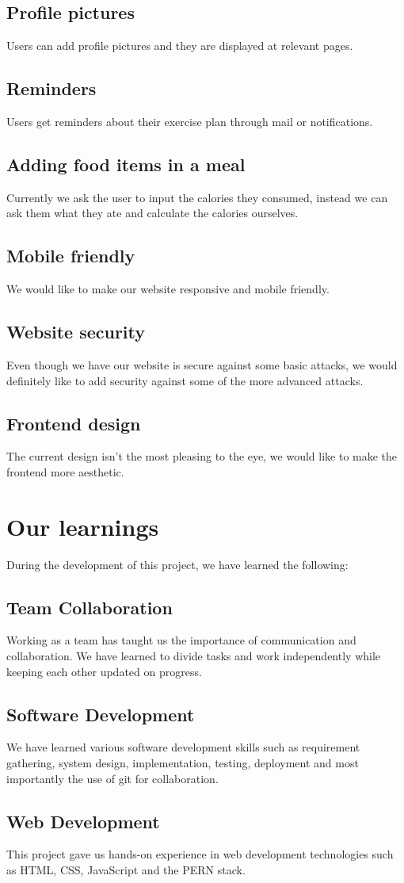 \documentclass{article}
\begin{document}
\subsection{Profile pictures}
Users can add profile pictures and they are displayed at relevant pages.
\subsection{Reminders}
Users get reminders about their exercise plan through mail or notifications.
\subsection{Adding food items in a meal}
Currently we ask the user to input the calories they consumed, instead we can ask them what they ate and calculate the calories ourselves.
\subsection{Mobile friendly}
We would like to make our website responsive and mobile friendly.
\subsection{Website security}
Even though we have our website is secure against some basic attacks, we would definitely like to add security against some of the more advanced attacks.
\subsection{Frontend design}
The current design isn't the most pleasing to the eye, we would like to make the frontend more aesthetic.

\section{Our learnings}
During the development of this project, we have learned the following:

\subsection{Team Collaboration}
Working as a team has taught us the importance of communication and collaboration. We have learned to divide tasks and work independently while keeping each other updated on progress. 
\subsection{Software Development}
We have learned various software development skills such as requirement gathering, system design, implementation, testing, deployment and most importantly the use of git for collaboration.
\subsection{Web Development}
This project gave us hands-on experience in web development technologies such as HTML, CSS, JavaScript and the PERN stack.
\end{document}
